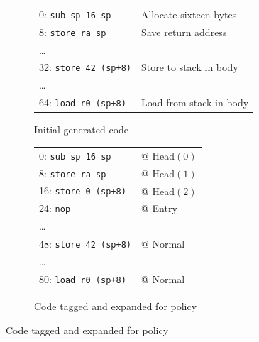 \begin{figure}
  \begin{subfigure}[t]{0.55\textwidth}
    \vspace{0em}
    \begin{tabular}{l l}
      0: {\tt sub sp 16 sp} & Allocate sixteen bytes \\
      8: {\tt store ra sp} & Save return address \\
      \dots \\
      32: {\tt store 42 (sp+8)} & Store to stack in body \\
      \dots \\
      64: {\tt load r0 (sp+8)} & Load from stack in body \\
    \end{tabular}
    \caption{Initial generated code}
    \label{ch1:ex:call1}
  \end{subfigure}
  \begin{subfigure}[t]{0.45\textwidth}
    \vspace{0em}
    \begin{tabular}{l l}
      0: {\tt sub sp 16 sp} & @ {\sc Head}\((0)\) \\
      8: {\tt store ra sp} & @ {\sc Head}\((1)\) \\
      16: {\tt store 0 (sp+8)} & @ {\sc Head}\((2)\) \\
      24: {\tt nop} & @ {\sc Entry} \\
      \dots \\
      48: {\tt store 42 (sp+8)} & @ {\sc Normal} \\
      \dots \\
      80: {\tt load r0 (sp+8)} & @ {\sc Normal} \\
    \end{tabular}
    \caption{Code tagged and expanded for policy}
    \label{ch1:ex:call2}
  \end{subfigure}

  \vspace{\belowdisplayskip}
  

\end{figure}
